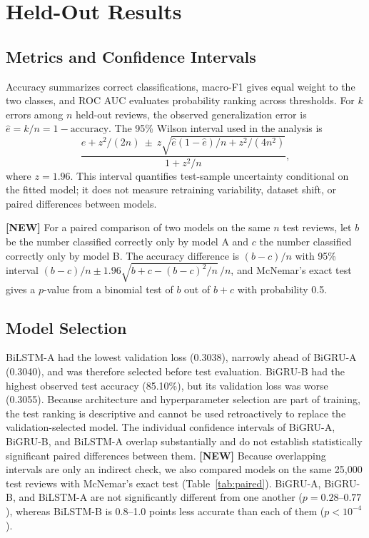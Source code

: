 \documentclass[conference]{IEEEtran}
\begin{document}
\section{Held-Out Results}
\subsection{Metrics and Confidence Intervals}
Accuracy summarizes correct classifications, macro-F1 gives equal weight to the two classes, and ROC AUC evaluates probability ranking across thresholds. For $k$ errors among $n$ held-out reviews, the observed generalization error is $\hat e=k/n=1-\mathrm{accuracy}$. The 95\% Wilson interval used in the analysis is
\begin{equation}
\frac{\hat e+z^2/(2n)\ \pm\ z
\sqrt{\hat e(1-\hat e)/n+z^2/(4n^2)}}
{1+z^2/n},
\end{equation}
where $z=1.96$. This interval quantifies test-sample uncertainty conditional on the fitted model; it does not measure retraining variability, dataset shift, or paired differences between models.

\textbf{[NEW]} For a paired comparison of two models on the same $n$ test reviews, let $b$ be the number classified correctly only by model A and $c$ the number classified correctly only by model B. The accuracy difference is $(b-c)/n$ with 95\% interval $(b-c)/n\pm1.96\sqrt{b+c-(b-c)^2/n}\,/n$, and McNemar's exact test gives a $p$-value from a binomial test of $b$ out of $b+c$ with probability 0.5.

\subsection{Model Selection}
BiLSTM-A had the lowest validation loss (0.3038), narrowly ahead of BiGRU-A (0.3040), and was therefore selected before test evaluation. BiGRU-B had the highest observed test accuracy (85.10\%), but its validation loss was worse (0.3055). Because architecture and hyperparameter selection are part of training, the test ranking is descriptive and cannot be used retroactively to replace the validation-selected model. The individual confidence intervals of BiGRU-A, BiGRU-B, and BiLSTM-A overlap substantially and do not establish statistically significant paired differences between them. \textbf{[NEW]} Because overlapping intervals are only an indirect check, we also compared models on the same 25,000 test reviews with McNemar's exact test (Table~\ref{tab:paired}). BiGRU-A, BiGRU-B, and BiLSTM-A are not significantly different from one another ($p=0.28$--$0.77$), whereas BiLSTM-B is 0.8--1.0 points less accurate than each of them ($p<10^{-4}$).
\end{document}

